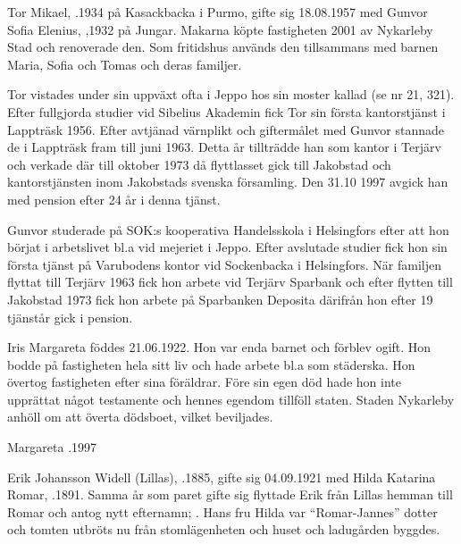 %



%
Tor Mikael, .1934 på Kasackbacka i Purmo, gifte sig 18.08.1957 med Gunvor Sofia Elenius, ,1932 på Jungar. Makarna köpte fastigheten 2001 av Nykarleby Stad och renoverade den. Som fritidshus används den tillsammans med barnen Maria, Sofia och Tomas och deras familjer.

Tor vistades under sin uppväxt ofta i Jeppo hos sin moster  kallad (se nr 21, 321). Efter fullgjorda studier vid Sibelius Akademin fick Tor sin första kantorstjänst i Lappträsk 1956. Efter avtjänad värnplikt och giftermålet med Gunvor stannade de i Lappträsk fram till juni 1963. Detta år tillträdde han som kantor i Terjärv och verkade där till oktober 1973 då flyttlasset gick till Jakobstad och kantorstjänsten inom Jakobstads svenska församling. Den 31.10 1997 avgick han med pension efter 24 år i denna tjänst.

Gunvor studerade på SOK:s kooperativa Handelsskola i Helsingfors efter att hon börjat i arbetslivet bl.a vid mejeriet i Jeppo. Efter avslutade studier fick hon sin första tjänst på Varubodens kontor vid Sockenbacka i Helsingfors. När familjen flyttat till Terjärv 1963 fick hon arbete vid Terjärv Sparbank och efter flytten till Jakobstad 1973 fick hon arbete på Sparbanken Deposita därifrån hon efter 19 tjänstår gick i pension.


%
Iris Margareta föddes 21.06.1922. Hon var enda barnet och förblev ogift. Hon bodde på fastigheten hela sitt liv och hade arbete bl.a som städerska. Hon övertog fastigheten efter sina föräldrar. Före sin egen död hade hon inte upprättat något testamente och hennes egendom tillföll staten. Staden Nykarleby anhöll om att överta dödsboet, vilket beviljades.

Margareta .1997


%
Erik Johansson Widell (Lillas), .1885, gifte sig 04.09.1921 med Hilda Katarina Romar, .1891. Samma år som paret gifte sig flyttade Erik från Lillas hemman till Romar och antog nytt efternamn; . Hans fru Hilda var ``Romar-Jannes'' dotter och tomten utbröts nu från stomlägenheten och huset och ladugården byggdes.

